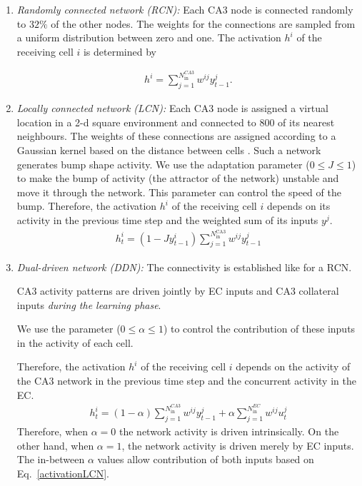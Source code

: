 \documentclass[utf8]{frontiersSCNS} %
\begin{document}
\begin{enumerate}
\item \textit{Randomly connected network (RCN):} Each CA3 node is connected randomly to $32\%$ of the other nodes. The weights for the connections are sampled from a uniform distribution between zero and one. The activation $h^i$ of the receiving cell $i$ is determined by

\begin{align}
	\label{activationRCN}
	h^i = \sum_{j=1}^{N^{CA3}_\mathrm{in}} w^{ij}y^{j}_{t-1}.
\end{align}  


\item \textit{Locally connected network (LCN):} Each CA3 node is assigned a virtual location in a 2-d square environment and connected to $800$ of its nearest neighbours. The weights of these connections are assigned according to a Gaussian kernel based on the distance between cells \cite{azizi2013computational}. 
Such a network generates bump shape activity. We use the adaptation parameter ($0 \leq J \leq 1$) to make the bump of activity (the attractor of the network) unstable and move it through the network. This parameter can control the speed of the bump. 
Therefore, the activation $h^i$ of the receiving cell $i$ depends on its activity in the previous time step and the weighted sum of its inputs $y^j$.
\begin{align}
\label{activationLCN}
h^{i}_{t} = (1 - J y^{i}_{t-1}) \sum_{j = 1}^{N^\mathrm{CA3}_\mathrm{in}} {{w^{ij} y^{j}_{t-1}}}
\end{align}

\item \textit{Dual-driven network (DDN):} The connectivity is established like for a RCN.

CA3 activity patterns are driven jointly by EC inputs and CA3 collateral inputs \textit{during the learning phase}.

We use the parameter ($0 \leq \alpha \leq 1$) to control the contribution of these inputs in the activity of each cell. 

Therefore, the activation $h^i$ of the receiving cell $i$ depends on the activity of the CA3 network in the previous time step and the concurrent activity in the EC.
\begin{align}
\label{activationDDN}
h^{i}_{t} = (1 - \alpha) \sum_{j = 1}^{N^{CA3}_\mathrm{in}} {{w^{ij} y^{j}_{t-1}}} + \alpha \sum_{j = 1}^{N^{EC}_\mathrm{in}} {{w^{ij} u^{j}_{t}}} 
\end{align}
Therefore, when $\alpha = 0$ the network activity is driven intrinsically. On the other hand, when $\alpha = 1$, the network activity is driven merely by EC inputs. The in-between $\alpha$ values allow contribution of both inputs based on Eq.~\ref{activationLCN}.        


\end{enumerate}
\end{document}
